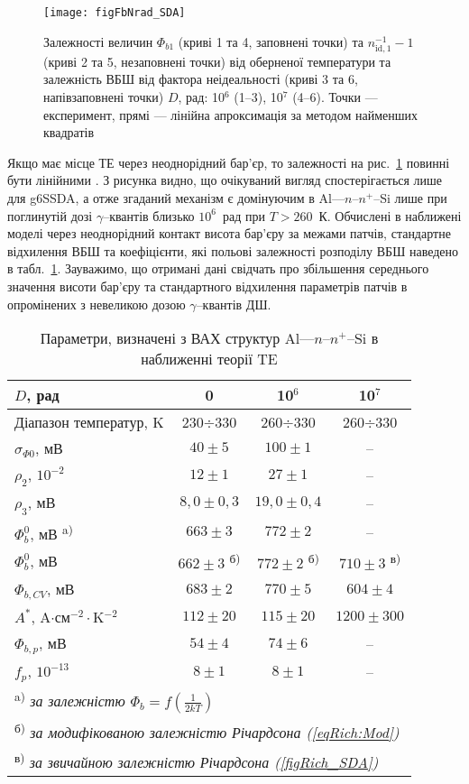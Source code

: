 \begin{figure}
\center
\texttt{[image: figFbNrad\_SDA]}
\caption{\label{figFbNrad_SDA}
Залежності величин $\Phi_{b1}$ (криві 1 та 4, заповнені точки) та
$n_{\mathrm{id},1}^{-1}-1$ (криві 2 та 5, незаповнені точки) від оберненої температури
та залежність ВБШ від фактора неідеальності (криві 3 та 6, напівзаповнені точки)
$D$, рад: 10$^6$ (1--3), 10$^7$ (4--6).
Точки --- експеримент,
прямі --- лінійна апроксимація за методом найменших квадратів
}%
\end{figure}

Якщо має місце ТЕ через неоднорідний бар'єр, то залежності на рис.~\ref{figFbNrad_SDA} повинні бути лінійними \cite{Werner,Tung:PhysRev,Schmitsdorf}.
З рисунка видно, що очікуваний вигляд спостерігається лише для g6SSDA,
а отже згаданий механізм є домінуючим в Al---$n$--$n^+$--Si лише при поглинутій дозі $\gamma$--квантів близько $10^6$~рад при $T>260$~К.
Обчислені в наближені моделі через неоднорідний контакт висота бар'єру за межами патчів,
стандартне відхилення ВБШ та коефіцієнти, які польові залежності розподілу ВБШ наведено в табл.~\ref{tabSDAParRad}.
Зауважимо, що отримані дані свідчать про збільшення середнього значення висоти бар'єру та
стандартного відхилення параметрів патчів в опромінених з невеликою дозою $\gamma$--квантів ДШ.

\begin{table}
\caption{Параметри, визначені з ВАХ структур Al---$n$--$n^+$--Si в наближенні теорії TE}
\label{tabSDAParRad}
\centering
\begin{tabular}{|l|c|c|c|}
\hline
$D$, рад & 0&10$^6$&10$^7$\\ \hline
Діапазон температур, K&230$\div$330&260$\div$330&260$\div$330\\ \hline
$\sigma_{\Phi0}$, мВ&$40\pm5$&$100\pm1$&--\\ \hline
$\rho_2$, $10^{-2}$&$12\pm1$&$27\pm1$&--\\ \hline
$\rho_3$, мВ&$8,0\pm0,3$&$19,0\pm0,4$&--\\ \hline
$\Phi_b^0$, мВ \textsuperscript{ a)}&$663\pm3$&$772\pm2$&--\\ \hline
$\Phi_b^0$, мВ &$662\pm3$ \textsuperscript{ б)}&$772\pm2$ \textsuperscript{ б)}&$710\pm3$ \textsuperscript{ в)}\\ \hline
$\Phi_{b,CV}$, мВ &$683\pm2$&$770\pm5$&$604\pm4$\\ \hline
$A^*$, A$\cdot$см$^{-2}\cdot$K$^{-2}$&$112\pm20$&$115\pm20$&$1200\pm300$\\
\hline
$\Phi_{b,p}$, мВ&$54\pm4$&$74\pm6$&--\\ \hline
$f_p$, $10^{-13}$&$8\pm1$&$8\pm1$&--\\ \hline
\multicolumn{4}{l}{\textsuperscript{ a)} \emph{за залежністю $\Phi_b=f(\frac{1}{2kT})$}} \\
\multicolumn{4}{l}{\textsuperscript{ б)} \emph{за модифікованою залежністю Річардсона (\ref{eqRich:Mod}) }} \\
\multicolumn{4}{l}{\textsuperscript{ в)} \emph{за звичайною залежністю Річардсона (\ref{figRich_SDA})}} \\
\end{tabular}
\end{table}


